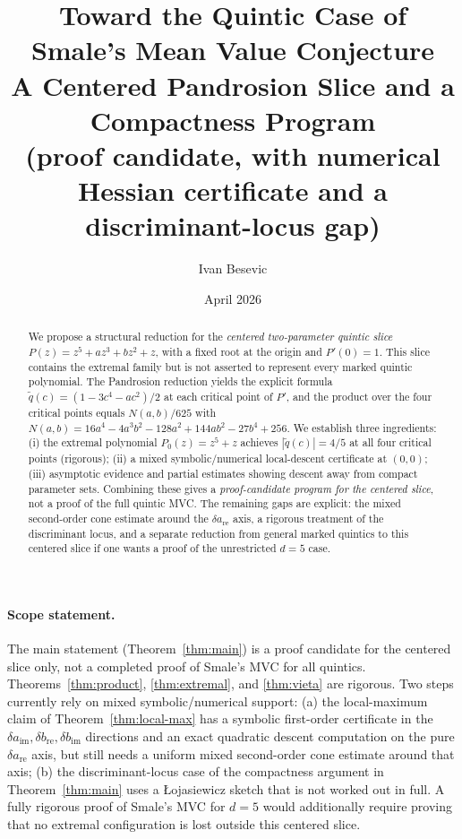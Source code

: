 \documentclass[11pt,a4paper]{article}
\title{Toward the Quintic Case of Smale's Mean Value Conjecture \\ A Centered Pandrosion Slice and a Compactness Program \\ \large (proof candidate, with numerical Hessian certificate and a discriminant-locus gap)}
\author{Ivan Besevic}
\date{April 2026}
\begin{document}
\maketitle

\begin{abstract}
We propose a structural reduction for the \emph{centered two-parameter quintic slice}
$P(z)=z^5+a z^3+b z^2+z$, with a fixed root at the origin and $P'(0)=1$.
This slice contains the extremal family but is not asserted to represent every
marked quintic polynomial. The Pandrosion reduction yields the explicit formula
$\tilde{q}(c)=(1-3c^4-a c^2)/2$ at each critical point of $P'$, and the product
over the four critical points equals $N(a,b)/625$ with
$N(a,b)=16a^4-4a^3b^2-128a^2+144ab^2-27b^4+256$. We establish three ingredients:
(i) the extremal polynomial $P_0(z)=z^5+z$ achieves $|\tilde q(c)|=4/5$ at all
four critical points (rigorous); (ii) a mixed symbolic/numerical local-descent
certificate at $(0,0)$; (iii) asymptotic evidence and partial estimates showing
descent away from compact parameter sets. Combining these gives a
\emph{proof-candidate program for the centered slice}, not a proof of the full
quintic MVC. The remaining gaps are explicit: the mixed second-order cone
estimate around the $\delta a_{\mathrm{re}}$ axis, a rigorous treatment of the
discriminant locus, and a separate reduction from general marked quintics to
this centered slice if one wants a proof of the unrestricted $d=5$ case.
\end{abstract}

\paragraph{Scope statement.} The main statement (Theorem~\ref{thm:main}) is a proof candidate for the centered slice only, not a completed proof of Smale's MVC for all quintics. Theorems~\ref{thm:product}, \ref{thm:extremal}, and \ref{thm:vieta} are rigorous. Two steps currently rely on mixed symbolic/numerical support: (a) the local-maximum claim of Theorem~\ref{thm:local-max} has a symbolic first-order certificate in the $\delta a_{\mathrm{im}},\delta b_{\mathrm{re}},\delta b_{\mathrm{im}}$ directions and an exact quadratic descent computation on the pure $\delta a_{\mathrm{re}}$ axis, but still needs a uniform mixed second-order cone estimate around that axis; (b) the discriminant-locus case of the compactness argument in Theorem~\ref{thm:main} uses a \L{}ojasiewicz sketch that is not worked out in full. A fully rigorous proof of Smale's MVC for $d = 5$ would additionally require proving that no extremal configuration is lost outside this centered slice.
\end{document}

